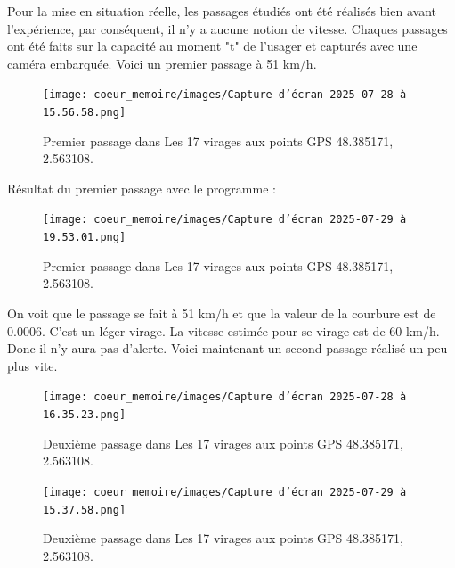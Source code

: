 Pour la mise en situation réelle, les passages étudiés ont été réalisés bien avant l'expérience, par conséquent, il n'y a aucune notion de vitesse. Chaques passages ont été faits sur la capacité au moment "t" de l'usager et capturés avec une caméra embarquée. Voici un premier passage à 51 km/h.
\begin{figure}[H]
    \centering
    \texttt{[image: coeur\_memoire/images/Capture d’écran 2025-07-28 à 15.56.58.png]} 
    \caption{Premier passage dans Les 17 virages aux points GPS 48.385171, 2.563108.}
\end{figure}

Résultat du premier passage avec le programme :
\begin{figure}[H]
    \centering
    \texttt{[image: coeur\_memoire/images/Capture d’écran 2025-07-29 à 19.53.01.png]} 
    \caption{Premier passage dans Les 17 virages aux points GPS 48.385171, 2.563108.}
\end{figure}
On voit que le passage se fait à 51 km/h et que la valeur de la courbure est de 0.0006. C'est un léger virage. La vitesse estimée pour se virage est de 60 km/h. Donc il n'y aura pas d'alerte. Voici maintenant un second passage réalisé un peu plus vite.
\begin{figure}[H]
    \centering
    \texttt{[image: coeur\_memoire/images/Capture d’écran 2025-07-28 à 16.35.23.png]} 
    \caption{Deuxième passage dans Les 17 virages aux points GPS 48.385171, 2.563108.}
\end{figure}

\begin{figure}[H]
    \centering
    \texttt{[image: coeur\_memoire/images/Capture d’écran 2025-07-29 à 15.37.58.png]} 
    \caption{Deuxième passage dans Les 17 virages aux points GPS  48.385171, 2.563108.}
\end{figure}

